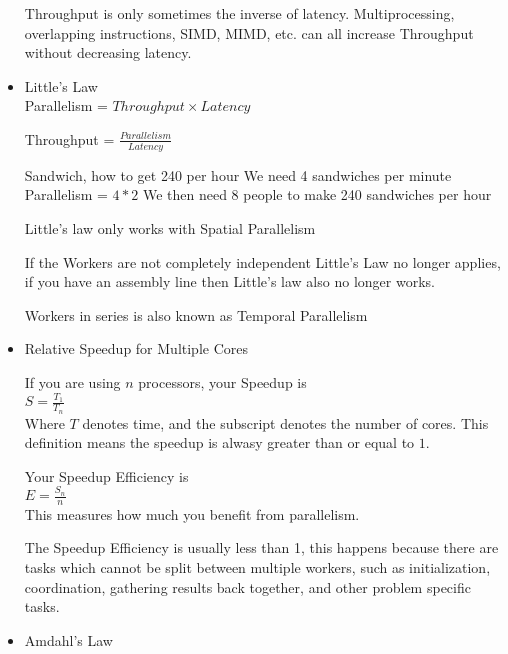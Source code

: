 \documentclass{report}
\begin{document}
\begin{mdframed}
\begin{itemize}
\begin{mdframed}
                Throughput is only sometimes the inverse of latency.
                Multiprocessing, overlapping instructions, SIMD,
                MIMD, etc. can all increase Throughput without decreasing
                latency.
            \end{mdframed}
            
        \item Little's Law\\
            Parallelism = $Throughput \times Latency$

            Throughput = $\frac{Parallelism}{Latency}$
            \begin{mdframed}
                Sandwich, how to get 240 per hour
                We need 4 sandwiches per minute
                Parallelism = $4 * 2$
                We then need 8 people to make 240 sandwiches per hour
            \end{mdframed}

            Little's law only works with Spatial Parallelism

            If the Workers are not completely independent
            Little's Law no longer applies, if you have an
            assembly line then Little's law also no longer
            works.

            Workers in series is also known as Temporal Parallelism

        \item Relative Speedup for Multiple Cores

            If you are using $n$ processors, your Speedup is\\
            $S = \frac{T_1}{T_n}$\\
            Where $T$ denotes time, and the subscript denotes
            the number of cores. This definition means
            the speedup is alwasy greater than or equal to $1$.

            Your Speedup Efficiency is\\
            $E = \frac{S_n}{n}$\\
            This measures how much you benefit from parallelism.

            The Speedup Efficiency is usually less than 1, this
            happens because there are tasks which cannot be split
            between multiple workers, such as initialization,
            coordination, gathering results back together, and
            other problem specific tasks.

        \item {\large Amdahl's Law}


\end{itemize}
\end{mdframed}
\end{document}
